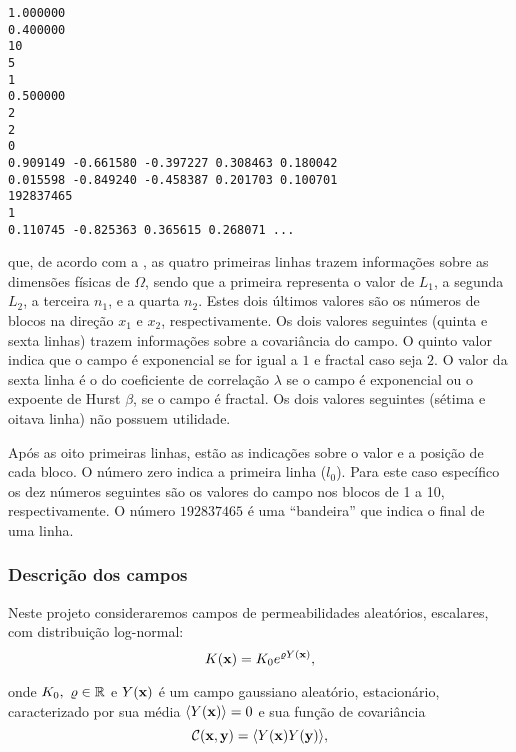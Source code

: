 \documentclass[12pt,a4paper,portuges]{article}
\begin{document}
\clearpage

\begin{flushleft}
\footnotesize
\begin{verbatim}
1.000000
0.400000
10
5
1
0.500000
2
2
0
0.909149 -0.661580 -0.397227 0.308463 0.180042 
0.015598 -0.849240 -0.458387 0.201703 0.100701 
192837465
1
0.110745 -0.825363 0.365615 0.268071 ...
\end{verbatim}
\end{flushleft}

\noindent que, de acordo com a , as quatro primeiras linhas trazem informações sobre as
dimensões físicas de $\Omega$, sendo que a primeira representa o valor de $L_1$, a segunda $L_2$, a
terceira $n_1$, e a quarta $n_2$. Estes dois últimos valores são os números de blocos na direção
$x_1$ e $x_2$, respectivamente. Os dois valores seguintes (quinta e sexta linhas) trazem informações
sobre a covariância do campo. O quinto valor indica que o campo é exponencial se for igual a $1$ e
fractal caso seja $2$. O valor da sexta linha é o do coeficiente de correlação $\lambda$ se o campo
é exponencial ou o expoente de Hurst $\beta$, se o campo é fractal. Os dois valores seguintes
(sétima e oitava linha) não possuem utilidade.

Após as oito primeiras linhas, estão as indicações sobre o valor e a posição de cada bloco. O número
zero indica a primeira linha ($l_0$). Para este caso específico os dez números seguintes são os
valores do campo nos blocos de 1 a 10, respectivamente. O número ${192837465}$ é uma ``bandeira''
que indica o final de uma linha. 

\subsubsection{Descrição dos campos}\label{descriccao_xi}

Neste projeto consideraremos campos de permeabilidades aleatórios, 
escalares, com distribuição log-normal:
\begin{equation}
	K(\mathbf{x}) = K_{0}e^{\varrho {Y}(\mathbf{x})},
\label{campok}
\end{equation}

\noindent onde $K_{0}, \ \varrho \in \mathbb{R}$ e  ${Y}(\mathbf{x})$ é  um
campo gaussiano aleatório, estacionário, caracterizado por sua  média $\langle
{Y}(\mathbf{x})\rangle = 0$ e sua função de covariância  
\begin{equation}
	\mathcal{C}(\mathbf{x}, \mathbf{y}) = \langle {Y}(\mathbf{x}){Y}(\mathbf{y})
\rangle,
\label{cov}
\end{equation}
\end{document}

